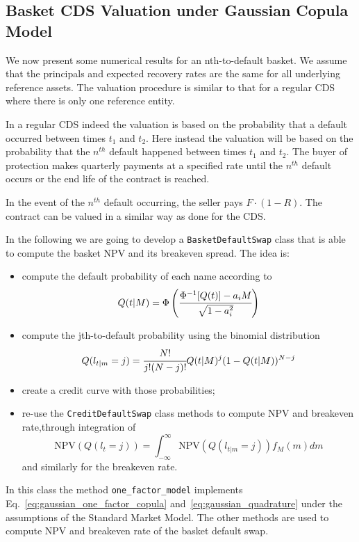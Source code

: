 \subsection{Basket CDS Valuation under Gaussian Copula Model}\label{basket-cds-valuation-under-market-standard-model}
We now present some numerical results for an nth-to-default basket.
We assume that the principals and expected recovery rates are the same
for all underlying reference assets. The valuation procedure is similar
to that for a regular CDS where there is only one reference entity.

In a regular CDS indeed the valuation is based on the probability that a
default occurred between times \(t_1\) and \(t_2\). Here instead the
valuation will be based on the probability that the $n^{th}$ default happened
between times \(t_1\) and \(t_2\).
The buyer of protection makes quarterly payments at a
specified rate until the $n^{th}$ default occurs or the end life
of the contract is reached.

In the event of the $n^{th}$ default occurring, the seller pays
\(F\cdot(1-R)\). The contract can be valued in a similar way as done for the CDS.

In the following we are going to develop a \texttt{BasketDefaultSwap} class that is able to compute the basket NPV and its breakeven spread.
The idea is:
\begin{itemize}
\item compute the default probability of each name according to 
\[Q(t|M) = \Phi\left(\cfrac{\Phi^{-1}[Q(t)]-a_i M}{\sqrt{1-a_i^2}}\right)\]
\item compute the jth-to-default probability using the binomial distribution
\[Q(l_{t|m} = j) = \cfrac{N!}{j!(N-j)!}Q(t|M)^j(1-Q(t|M))^{N-j}\]
\item create a credit curve with those probabilities;
\item re-use the \texttt{CreditDefaultSwap} class methods to compute NPV and breakeven rate,through integration of
\[ \mathrm{NPV}(Q(l_{t} = j)) = \int_{-\infty}^{\infty}{\mathrm{NPV}(Q(l_{t|m} = j)) f_M(m)dm} \]
and similarly for the breakeven rate.
\end{itemize}

In this class the method \texttt{one\_factor\_model} implements Eq.~\ref{eq:gaussian_one_factor_copula} and~\ref{eq:gaussian_quadrature} under the assumptions of the Standard Market Model.
The other methods are used to compute NPV and breakeven rate of the basket default swap.

